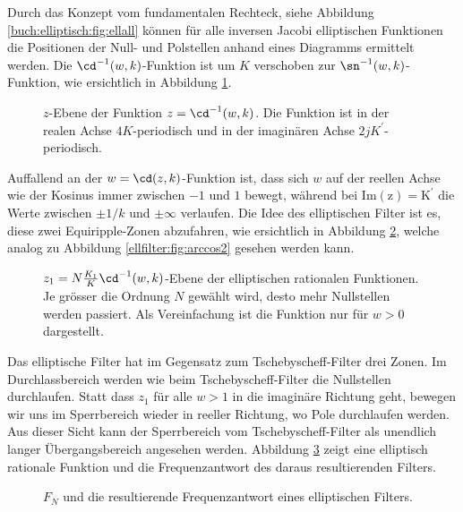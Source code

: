 Durch das Konzept vom fundamentalen Rechteck, siehe Abbildung \ref{buch:elliptisch:fig:ellall} können für alle inversen Jacobi elliptischen Funktionen die Positionen der Null- und Polstellen anhand eines Diagramms ermittelt werden.
Die $\cd^{-1}(w, k)$-Funktion ist um $K$ verschoben zur $\sn^{-1}(w, k)$-Funktion, wie ersichtlich in Abbildung \ref{ellfilter:fig:cd}.
\begin{figure}
    \centering
    
    \caption{
        $z$-Ebene der Funktion $z = \cd^{-1}(w, k)$.
        Die Funktion ist in der realen Achse $4K$-periodisch und in der imaginären Achse $2jK^\prime$-periodisch.
    }
    \label{ellfilter:fig:cd}
\end{figure}
Auffallend an der $w = \cd(z, k)$-Funktion ist, dass sich $w$ auf der reellen Achse wie der Kosinus immer zwischen $-1$ und $1$ bewegt, während bei $\mathrm{Im(z) = K^\prime}$ die Werte zwischen $\pm 1/k$ und $\pm \infty$ verlaufen.
Die Idee des elliptischen Filter ist es, diese zwei Equiripple-Zonen abzufahren, wie ersichtlich in Abbildung \ref{ellfilter:fig:cd2}, welche analog zu Abbildung \ref{ellfilter:fig:arccos2} gesehen werden kann.
\begin{figure}
    \centering
    
    \caption{
        $z_1=N\frac{K_1}{K}\cd^{-1}(w, k)$-Ebene der elliptischen rationalen Funktionen.
        Je grösser die Ordnung $N$ gewählt wird, desto mehr Nullstellen werden passiert.
        Als Vereinfachung ist die Funktion nur für $w>0$ dargestellt.
    }
    \label{ellfilter:fig:cd2}
\end{figure}
Das elliptische Filter hat im Gegensatz zum Tschebyscheff-Filter drei Zonen.
Im Durchlassbereich werden wie beim Tschebyscheff-Filter die Nullstellen durchlaufen.
Statt dass $z_1$ für alle $w>1$ in die imaginäre Richtung geht, bewegen wir uns im Sperrbereich wieder in reeller Richtung, wo Pole durchlaufen werden.
Aus dieser Sicht kann der Sperrbereich vom Tschebyscheff-Filter als unendlich langer Übergangsbereich angesehen werden.
Abbildung \ref{ellfilter:fig:elliptic_freq} zeigt eine elliptisch rationale Funktion und die Frequenzantwort des daraus resultierenden Filters.
\begin{figure}
    \centering
    
    \caption{$F_N$ und die resultierende Frequenzantwort eines elliptischen Filters.}
    \label{ellfilter:fig:elliptic_freq}
\end{figure}

